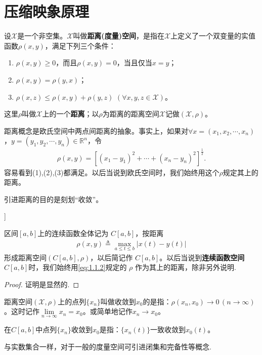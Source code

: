 \documentclass[../../main.tex]{subfiles}
\begin{document}
\section{压缩映象原理}

\begin{definition}
设$\mathscr{X}$是一个非空集。$\mathscr{X}$叫做\textbf{距离(度量)空间}，是指在$\mathscr{X}$上定义了一个双变量的实值函数$\rho(x,y)$，满足下列三个条件：
\begin{enumerate}[(1)]
\item $\rho(x,y)\geqslant 0$，而且$\rho(x,y)=0$，当且仅当$x=y$；
\item $\rho(x,y)=\rho(y,x)$；
\item $\rho(x,z)\leqslant \rho(x,y)+\rho(y,z)$ $(\forall x,y,z\in \mathscr{X})$。
\end{enumerate}
这里$\rho$叫做$\mathscr{X}$上的一个\textbf{距离}；以$\rho$为距离的距离空间$\mathscr{X}$记做$(\mathscr{X},\rho)$。
\end{definition}
\begin{remark}
距离概念是欧氏空间中两点间距离的抽象。事实上，如果对$\forall x=(x_1,x_2,\cdots,x_n)$，$y=(y_1,y_2,\cdots,y_n)\in \mathbb{R}^n$，令
\begin{align*}
\rho(x,y)=\left[(x_1 - y_1)^2 + \cdots + (x_n - y_n)^2\right]^{\frac{1}{2}}.
\end{align*}
容易看到(1),(2),(3)都满足。以后当说到欧氏空间时，我们始终用这个$\rho$规定其上的距离。
\end{remark}
\begin{note}
引进距离的目的是刻划“收敛”。
\end{note}

\begin{example}[空间C[a,b]]

区间$[a,b]$上的连续函数全体记为 $C[a,b]$，按距离
\begin{align}
\label{eq:1.1.2}
\rho(x,y) \triangleq \max_{a \leqslant t \leqslant b} |x(t) - y(t)|
\end{align}
形成距离空间$(C[a,b],\rho)$，以后简记作 $C[a,b]$。以后当说到\textbf{连续函数空间} $C[a,b]$时，我们始终用\eqref{eq:1.1.2}规定的 $\rho$ 作为其上的距离，除非另外说明.
\end{example}
\begin{proof}
证明是显然的.
\end{proof}

\begin{definition}
距离空间$(\mathscr{X},\rho)$上的点列$\{x_n\}$叫做收敛到$x_0$的是指：$\rho(x_n,x_0)\to 0\,(n\to \infty)$。这时记作$\lim\limits_{n \to \infty} x_n = x_0$。或简单地记作$x_n \to x_0$。
\end{definition}
\begin{remark}
在$C[a,b]$中点列$\{x_n\}$收敛到$x_0$是指：$\{x_n(t)\}$一致收敛到$x_0(t)$。
\end{remark}
\begin{note}
与实数集合一样，对于一般的度量空间可引进闭集和完备性等概念.
\end{note}
\end{document}
